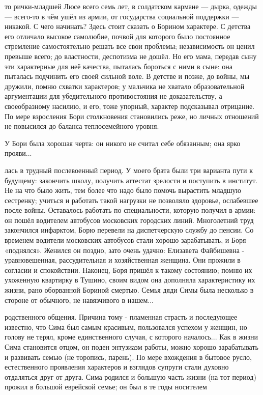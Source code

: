 \label{39-1}
то рички-младшей Люсе всего семь лет, в солдатском кармане — дырка, одежды — всего-то в чём ушёл из армии, от государства социальной поддержки — никакой. С чего начинать? Здесь стоит сказать о Борином характере. С детства его отличало высокое самолюбие, почвой для которого было постоянное стремление самостоятельно решать все свои проблемы; независимость он ценил превыше всего; до властности, деспотизма не дошёл. Но его мама, передав сыну эти характерные для неё качества, пыталась бороться с ними в сыне: она пыталась подчинить его своей сильной воле. В детстве и позже, до войны, мы дружили, помню схватки характеров; у мальчика не хватало образовательной аргументации для убедительного противостояния не доказательству, а своеобразному насилию, и его, тоже упорный, характер подсказывал отрицание. По мере взросления Бори столкновения становились реже, но личных отношений не повысился до баланса теплосемейного уровня.

У Бори была хорошая черта: он никого не считал себе обязанным; она ярко прояви...

\label{40-1}
лась в трудный послевоенный период. У моего брата были три варианта пути к будущему: закончить школу, получить аттестат зрелости и поступить в институт. Не на что было жить, тем более что надо было помочь вырастить младшую сестренку; учиться и работать такой нагрузки не позволяло здоровье, ослабевшее после войны. Оставалось работать по специальности, которую получил в армии: он пошёл водителем автобусов московских городских линий. Многолетний труд закончился инфарктом, Борю перевели на диспетчерскую службу до пенсии. Со временем водители московских автобусов стали хорошо зарабатывать, и Боря «поднялся». Женился он поздно, зато очень удачно: Елизавета Файбишевна - уравновешенная, рассудительная и хозяйственная женщина. Они прожили в согласии и спокойствии. Наконец, Боря пришёл к такому состоянию; помню их ухоженную квартирку в Тушино, своим видом она дополняла характеристику их жизни, рано оборванной Бориной смертью. Семья дяди Симы была несколько в стороне от обычного, не навязчивого в нашем...


\label{41-1}
родственного общения. Причина тому - пламенная страсть и последующее известно, что Сима был самым красивым, пользовался успехом у женщин, но голову не терял, кроме единственного случая, с которого началось... Как в жизни Сима становится отцом, он поден энтузиазм работы, можно хорошо зарабатывать и развивать семью (не торопись, парень). По мере вхождения в бытовое русло, естественного проявления характеров и взглядов супруги стали духовно отдаляться друг от друга. Сима родился и большую часть жизни (на тот период) прожил в большой еврейской семье; он был в те годы носителем

